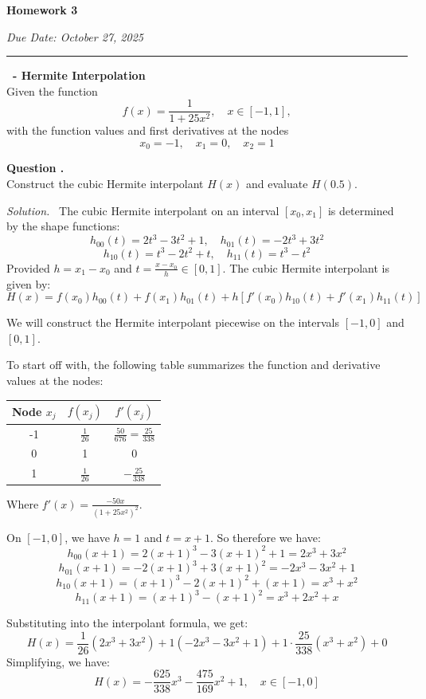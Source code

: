 \documentclass[12pt]{article}
\newcounter{question}
\newcounter{subquest}
\newcommand{\question}[1]{
    \stepcounter{question} 
    \vspace{1em}
    \textbf{\Large\thequestion \ - #1}
    \vspace{.5em} 
    \setcounter{subquest}{0}\ \\}
\newcommand{\subquestion}{
    \stepcounter{subquest} 
    \vspace{.5em}
    \textbf{\large Question \thequestion.\thesubquest}
    \vspace{.25em}\ \\}
\newcommand{\solution}
    {\par\vspace{0.5em}\noindent\emph{Solution.}\ }
    {\par\vspace{1em}}
\begin{document}
\begin{center}
\textbf{\huge Homework 3}

{\large\emph{Due Date: October 27, 2025}}
\vspace{1em}
\end{center}
\hrule

\question{Hermite Interpolation}

Given the function 
\[f(x)=\frac{1}{1+25x^2}, \quad x\in[-1,1],\]
with the function values and first derivatives at the nodes 
\[x_0=-1, \quad x_1=0, \quad x_2=1 \]

\subquestion
Construct the cubic Hermite interpolant $H(x)$ and evaluate $H(0.5)$.

\solution
The cubic Hermite interpolant on an interval $[x_0, x_{1}]$ is determined by the shape functions:
\[h_{00}(t) = 2t^3 - 3t^2 + 1, \quad h_{01}(t) = -2t^3 + 3t^2\]
\[h_{10}(t) = t^3 - 2t^2 + t, \quad h_{11}(t) = t^3 - t^2\]
Provided $h=x_1-x_0$ and $t=\frac{x-x_0}{h} \in [0,1]$. 
The cubic Hermite interpolant is given by:
\[H(x) = f(x_0)h_{00}(t) + f(x_1)h_{01}(t) + h\left[f'(x_0)h_{10}(t) + f'(x_1)h_{11}(t)\right]\]

We will construct the Hermite interpolant piecewise on the intervals $[-1,0]$ and $[0,1]$.

To start off with, the following table summarizes the function and derivative values at the nodes:
\begin{center}
\begin{tabular}{|c|c|c|}
\hline
Node $x_j$ & $f(x_j)$ & $f'(x_j)$ \\
\hline
-1 & $\frac{1}{26}$ & $\frac{50}{676} = \frac{25}{338}$ \\
0 & 1 & 0 \\
1 & $\frac{1}{26}$ & $-\frac{25}{338}$ \\
\hline
\end{tabular}
\end{center}
Where $f'(x)=\frac{-50x}{(1+25x^2)^2}$.

On $[-1,0]$, we have $h=1$ and $t=x+1$. So therefore we have:
\[h_{00}(x+1) = 2(x+1)^3 - 3(x+1)^2 + 1 = 2x^3 + 3x^2\]
\[h_{01}(x+1) = -2(x+1)^3 + 3(x+1)^2 = -2x^3 - 3x^2 + 1\]
\[h_{10}(x+1) = (x+1)^3 - 2(x+1)^2 + (x+1) = x^3 + x^2\]
\[h_{11}(x+1) = (x+1)^3 - (x+1)^2 = x^3+2x^2+x\]

Substituting into the interpolant formula, we get:
\[H(x) = \frac{1}{26}(2x^3 + 3x^2) + 1(-2x^3 - 3x^2 + 1) + 1 \cdot \frac{25}{338}(x^3 + x^2) + 0\]
Simplifying, we have:
\[H(x) = -\frac{625}{338}x^3 - \frac{475}{169}x^2 + 1, \quad x\in[-1,0]\]
\end{document}

